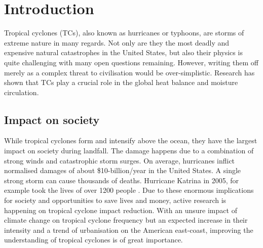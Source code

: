 

\chapter{Introduction}\label{sec:introduction}
Tropical cyclones (TCs), also known as hurricanes or typhoons, are storms of extreme nature in many regards. Not only are they the most deadly and expensive natural catastrophes in the United States, but also their physics is quite challenging with many open questions remaining\cite{emanuel-summ}.
However, writing them off merely as a complex threat to civilisation would be over-simplistic. Research has shown that TCs play a crucial role in the global heat balance and moisture circulation\cite{moisture-transport}\cite{global-heat}.

\section{Impact on society}\label{sec:society}
While tropical cyclones form and intensify above the ocean, they have the largest impact on society during landfall. The damage happens due to a combination of strong winds and catastrophic storm surges. On average, hurricanes inflict normalised damages of about \$10-billion/year in the United States\cite{damage-norm}. A single strong storm can cause thousands of deaths. Hurricane Katrina in 2005, for example took the lives of over 1200 people \cite{hurr-2005}.
Due to these enormous implications for society and opportunities to save lives and money, active research is happening on tropical cyclone impact reduction. With an unsure impact of climate change on tropical cyclone frequency but an expected increase in their intensity and a trend of urbanisation on the American east-coast, improving the understanding of tropical cyclones is of great importance.

